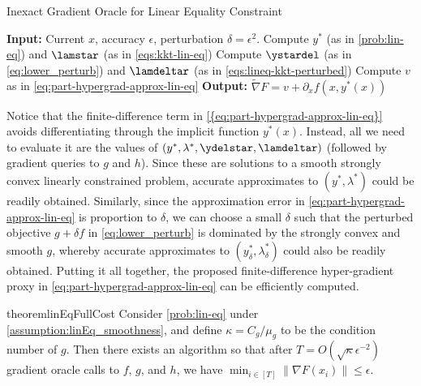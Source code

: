 \begin{algorithm}[h]
\begin{algorithmic}[1]\caption{Inexact Gradient Oracle for Linear Equality Constraint}\label{alg:LE-inexact-gradient-oracle}
\State \textbf{Input:}
Current $x$, accuracy $\epsilon$, perturbation $\delta = \epsilon^2$.
\State Compute $y^*$ (as in \cref{prob:lin-eq}) and $\lamstar$ (as in \cref{eqs:kkt-lin-eq}) 
\State Compute $\ystardel$ (as in \cref{eq:lower_perturb}) and $\lamdeltar$ (as in \cref{eqs:lineq-kkt-perturbed}) 
\State Compute $v$ as in \cref{eq:part-hypergrad-approx-lin-eq} 
\State \textbf{Output:} $\widetilde{\nabla} F = v + \partial_x f(x, y^*(x))$
\end{algorithmic}
\end{algorithm}

Notice that the finite-difference term in \cref{{eq:part-hypergrad-approx-lin-eq}} avoids differentiating through the implicit function $y^*(x)$. Instead, all we need to evaluate it are the values of $(y^*,\lambda^*,\ydelstar,\lamdeltar)$ (followed by gradient queries to $g$ and $h$). Since these are  solutions to a smooth strongly convex linearly constrained  problem, accurate approximates to $(y^*,\lambda^*)$ could be readily obtained. Similarly, since the approximation error in \cref{eq:part-hypergrad-approx-lin-eq}  is proportion to $\delta$, we can choose a  small $\delta$  such that the perturbed objective $ g+\delta f$ in \cref{eq:lower_perturb} is dominated by the strongly convex and smooth $g$, whereby accurate approximates to $(y_\delta^*,\lambda_\delta^*)$ could also be readily obtained. Putting it all together, the proposed finite-difference hyper-gradient proxy in \cref{eq:part-hypergrad-approx-lin-eq}  can be  efficiently computed.

\begin{restatable}{theorem}{linEqFullCost}\label{thm:lineq-cost}
    Consider  \cref{prob:lin-eq} under \cref{assumption:linEq_smoothness}, and define $\kappa=C_g/\mu_g$ to be the condition number of $g$. Then there exists an algorithm so that after $T=O(\sqrt{\kappa}\epsilon^{-2})$ gradient oracle calls to $f$, $g$, and $h$, we have $\min_{i\in [T]} \|\nabla F(x_i)\|\leq \epsilon$. 
\end{restatable}


